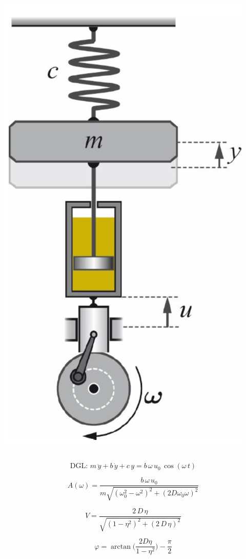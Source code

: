 \begin{minipage}{0.25\linewidth}
\includegraphics[width=0.9\linewidth]{Bilder/Wellen-Optik/daempfererregung} \\
\\
\end{minipage}
\hfill
\begin{minipage}{0.72\linewidth}
$$ \boxed{ \text{DGL: } m \, \ddot{y} + b \, \dot{y} + c \, y = b \, \omega  \, u_0 \, \cos(\omega \, t)  } $$  

$$ A(\omega) =  \frac{b \, \omega \, u_0}{m\sqrt{(\omega_0^2 -\omega^2)^2 + (2D \omega_0 \omega)^2}} $$ 

$$ \boxed{ V = \frac{2 \, D \, \eta}{\sqrt{(1- \eta^2)^2 + (2 \, D \, \eta)^2} } } $$

$$ \boxed{ \varphi = \arctan \Big( \frac{2 D \eta}{1 - \eta^2} \Big) - \frac{\pi}{2} } $$ 


\end{minipage}


